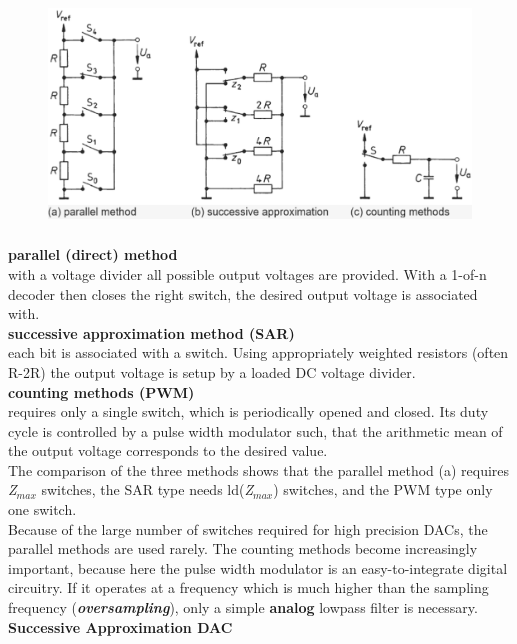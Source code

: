     \begin{figure}[h]
    \centering
    \includegraphics[width=14cm, height=6cm]{Images/image31.png}
    \label{fig:Fig }
    \end{figure}

\textbf{parallel (direct) method}\\
with a voltage divider all possible output voltages are provided. With a 1-of-n decoder then closes the right switch, the desired output voltage is associated with.\\

\textbf{successive approximation method (SAR)}\\
each bit is associated with a switch. Using appropriately weighted resistors (often R-2R) the output voltage is setup by a loaded DC voltage divider.\\

\textbf{counting methods (PWM)}\\
requires only a single switch, which is periodically opened and closed. Its duty cycle is controlled by a pulse width modulator such, that the arithmetic mean of the output voltage corresponds to the desired value.\\

The comparison of the three methods shows that the parallel method (a) requires \textit{Z${}_{max}$} switches, the SAR type needs ld(\textit{Z${}_{max}$}) switches, and the PWM type only one switch. \\

Because of the large number of switches required for high precision DACs, the parallel methods are used rarely. The counting methods become increasingly important, because here the pulse width modulator is an easy-to-integrate digital circuitry. If it operates at a frequency which is much higher than the sampling frequency (\textbf{\textit{oversampling}}), only a simple \textbf{analog} lowpass filter is necessary.\\
\newpage
{\rot\bf Successive Approximation DAC}

